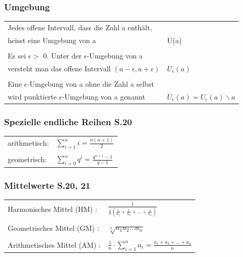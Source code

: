 		\subsubsection{Umgebung}
			\begin{tabular}{ll} 
				Jedes offene Intervall, dass die Zahl a enthält, & \\ 
				heisst eine Umgebung von a                       &  U(a)\\
				\\
				Es sei $\epsilon >$ 0. Unter der $\epsilon$-Umgebung von a & \\ 
				versteht man das offene Intervall $(a-\epsilon,a+\epsilon)$ &  $U_\epsilon(a)$\\ 
				\\
				Eine $\epsilon$-Umgebung von a ohne die Zahl a selbst & \\ 
				wird punktierte $\epsilon$-Umgebung von a genannt & $\dot{U}_\epsilon(a)=U_\epsilon(a)\smallsetminus{a}$ \\ 
			\end{tabular}
			
		\subsubsection{Spezielle endliche Reihen S.20}
			\begin{tabular}{ll} 
				arithmetisch: & $\sum\limits _{i=1}^n i = \frac{n(n+1)}{2}$ \\
				\\
				geometrisch: & $\sum\limits _{i=0}^n q^i = \frac{q^{n+1} - 1}{q - 1}$ \\
			\end{tabular}
				
		\subsubsection{Mittelwerte S.20, 21}
			\begin{tabular}{ll} 
				Harmonisches Mittel (HM) : &  $\frac{1}{\frac{1}{n}(\frac{1}{a_1}+\frac{1}{a_2}+...+\frac{1}{a_n})}$ \\
				\\
				Geometrisches Mittel (GM) : & $\sqrt[n]{a_1 a_2 \ldots a_n}$ \\
				\\
				Arithmetisches Mittel (AM) : & $\frac{1}{n} \cdot \sum\limits _{i=1}^n a_i = 	\frac{a_1+a_2+...+a_n}{n}$ \\
			\end{tabular}
			
